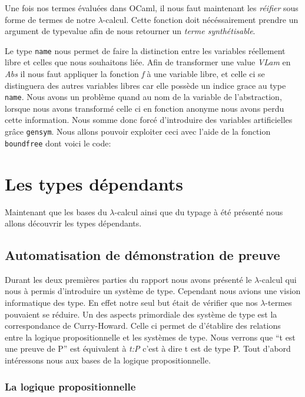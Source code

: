 \documentclass {article}
\newcommand{\codefrom}[3]
           {}
\theoremstyle{definition}
\theoremstyle{remark}
\newcommand{\fun}[1]{\lstinline!#1!}
\begin{document}
Une fois nos termes évaluées dans OCaml, il nous faut maintenant les
\emph{réifier} sous forme de termes de notre
$\lambda$-calcul. Cette fonction doit nécéssairement prendre un argument de
type{value} afin de nous retourner un \emph{terme synthétisable}.

\codefrom{typed}{lambda}{value_to_inTm}
\codefrom{typed}{lambda}{neutral_to_exTm}



Le type \fun{name} nous permet de faire la distinction entre les
variables réellement libre et celles que nous souhaitons liée.
Afin de transformer une value \emph{VLam} en
\emph{Abs} il nous faut appliquer la fonction \emph{f} à une variable
libre, et celle ci se distinguera des autres variables libres car elle
possède un indice grace au type \fun{name}.
Nous avons un problème quand au nom de la variable de l'abstraction, lorsque nous
avons transformé celle ci en fonction anonyme nous avons perdu cette information.
Nous somme donc forcé d'introduire des variables artificielles grâce \fun{gensym}.
Nous allons pouvoir exploiter ceci avec l'aide de
la fonction \fun{boundfree} dont voici le code:
\codefrom{typed}{lambda}{boundfree}



\section{Les types dépendants}

Maintenant que les bases du $\lambda$-calcul ainsi que du typage à été présenté 
nous allons découvrir les types dépendants. 
 
\subsection{Automatisation de démonstration de preuve}
Durant les deux premières parties du rapport nous avons présenté le $\lambda$-calcul
qui nous à permis d'introduire un système de type. Cependant nous avions une vision 
informatique des type. En effet notre seul but était de vérifier que nos $\lambda$-termes
pouvaient se réduire. 
Un des aspects primordiale des système de type est la correspondance de Curry-Howard.
Celle ci permet de d'établire des relations entre la logique propositionnelle et les systèmes 
de type. Nous verrons que ``t est une preuve de P'' est équivalent à \emph{t:P} c'est à dire
t est de type P.
Tout d'abord intéressons nous aux bases de la logique propositionnelle.
\subsubsection{La logique propositionnelle}
\end{document}
